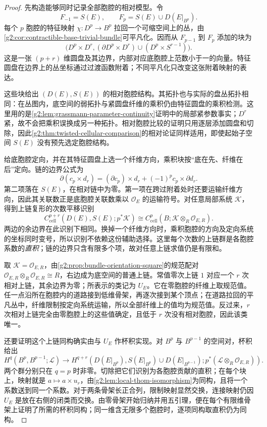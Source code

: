 \begin{proof}
	先构造能够同时记录全部胞腔的相对模型。令
	\[
		F_{-1}=S(E),\qquad F_p=S(E)\cup D(E|_{B^p}).
	\]
	每个 \(p\) 胞腔的特征映射 \(\chi:D^p\to B^p\) 拉回一个可缩空间上的丛，由\cref{g2:cor:contractible-base-trivial-bundle}可平凡化。因而从 \(F_{p-1}\) 到 \(F_p\) 添加的块为
	\[
		\bigl(D^p\times D^r,(\partial D^p\times D^r)\cup(D^p\times S^{r-1})\bigr).
	\]
	这是一张 \((p+r)\) 维圆盘及其边界，内部对应底胞腔上范数小于一的向量。特征圆盘在边界上的丛坐标通过过渡函数附着；不同平凡化只改变这张附着映射的表达。

	这些块给出 \((D(E),S(E))\) 的相对胞腔结构。其拓扑也与实际的盘丛拓扑相同：在丛图内，底空间的弱拓扑与紧圆盘纤维的乘积仍由特征圆盘的乘积检测。这里用的是\cref{g2:lem:grassmann-parameter-continuity}证明中的局部紧参数事实；\(D^r\) 紧，故不会把乘积误换成另一种拓扑。相对胞腔比较的证明只用逐层添加圆盘和切除，因此\cref{g2:thm:twisted-cellular-comparison}的相对论证同样适用，即使起始子空间 \(S(E)\) 没有预先选定胞腔结构。

	给底胞腔定向，并在其特征圆盘上选一个纤维方向，乘积块按“底在先、纤维在后”定向。链的边界公式为
	\[
		\partial(c_p\times d_r)=(\partial c_p)\times d_r+(-1)^pc_p\times\partial d_r.
	\]
	第二项落在 \(S(E)\)，在相对链中为零。第一项在跨过附着处时还要运输纤维方向，因此其关联数正是底胞腔关联数乘以 \(\mathcal O_E\) 的运输符号。对任意局部系统 \(\mathcal K\)，得到上链复形的次数平移识别
	\begin{equation}\label{g2:eq:thom-cellular-complex}
		C^{p+r}_{\mathrm{cell}}(D(E),S(E);p^*\mathcal K)
		\cong C^p_{\mathrm{cell}}(B;\mathcal K\otimes_R\mathcal O_{E,R}).
	\end{equation}
	两边的余边界在此识别下相同。换掉一个纤维方向时，乘积胞腔的方向及定向系统的坐标同时变号，所以识别不依赖这份辅助选择。这里每个次数的上链群是各胞腔系数的\emph{直积}；链的边界只含有限多个项，故对任意上链求值仍是有限和。

	取 \(\mathcal K=\mathcal O_{E,R}\)，由\cref{g2:prop:bundle-orientation-square}的规范配对 \(\mathcal O_{E,R}\otimes_R\mathcal O_{E,R}\cong R\)，右边成为底空间的普通上链。常值零次上链 \(1\) 对应一个 \(r\) 次相对上链，其余边界为零；所表示的类记为 \(U_E\)。它在零胞腔的纤维上取规范值。任一点沿所在胞腔内的道路接到低维骨架，再逐次接到某个顶点；在道路拉回的平凡丛中，纤维限制按定向系统运输，所以全部纤维上的值均为规范值。反过来，\(r\) 次相对上链完全由零胞腔上的这些值确定，且低于 \(r\) 次没有相对胞腔，因此该类唯一。

	还要证明这个上链同构确实由与 \(U_E\) 作杯积实现。对 \(B^p\) 与 \(B^{p-1}\) 的空间对，杯积给出
	\[
		H^q(B^p,B^{p-1};\mathcal L)\longrightarrow
		H^{q+r}(D(E|_{B^p}),S(E|_{B^p})\cup D(E|_{B^{p-1}});p^*(\mathcal L\otimes_R\mathcal O_{E,R})).
	\]
	两个群分别只在 \(q=p\) 时非零。切除把它们识别为各胞腔贡献的直积；在每个块上，映射就是 \(a\mapsto a\times u_r\)，由\cref{g2:lem:local-thom-isomorphism}为同构，且将一个系数送到同一个系数。对于两条骨架长正合列，限制映射显然交换，连接映射仍因 \(U_E\) 是放在右侧的闭类而交换。由零骨架开始归纳并用五引理，便在每个有限维骨架上证明了所需的杯积同构；同一维含无限多个胞腔时，逐项同构取直积仍为同构。


\end{proof}
